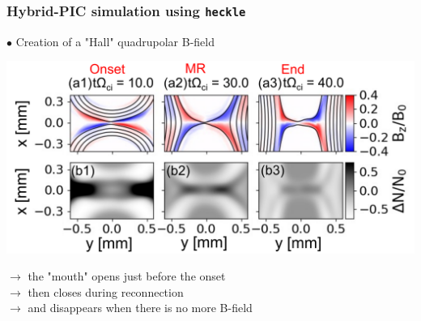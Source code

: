 \documentclass{beamer}
\begin{document}
\begin{frame}
\frametitle{Hybrid-PIC simulation using \texttt{heckle}}

$\bullet$ Creation of a "Hall" quadrupolar B-field\\

\begin{center}
\includegraphics[width=1.0\textwidth]{heckle.png}
\end{center}

$\to$ the "mouth" opens just before the onset \\
$\to$ then closes during reconnection \\
$\to$ and disappears when there is no more B-field \\

\end{frame}
\end{document}
